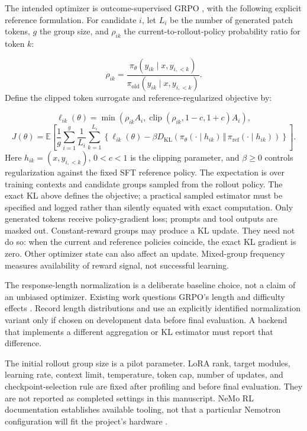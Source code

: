 \documentclass[11pt,a4paper]{article}
\begin{document}
The intended optimizer is outcome-supervised GRPO \cite{ref12}, with the following explicit reference formulation. For candidate $i$, let $L_i$ be the number of generated patch tokens, $g$ the group size, and $\rho_{ik}$ the current-to-rollout-policy probability ratio for token $k$:

\begin{equation}
\rho_{ik}=\frac{\pi_\theta(y_{ik}\mid x,y_{i,<k})}
{\pi_{\mathrm{old}}(y_{ik}\mid x,y_{i,<k})}.
\end{equation}
Define the clipped token surrogate and reference-regularized objective by:

\begin{equation}
\ell_{ik}(\theta)=\min\!\left(\rho_{ik}A_i,\operatorname{clip}(\rho_{ik},1-c,1+c)A_i\right),
\end{equation}
\begin{equation}
J(\theta)=\mathbb{E}\!\left[
\frac{1}{g}\sum_{i=1}^{g}\frac{1}{L_i}\sum_{k=1}^{L_i}
\left\{\ell_{ik}(\theta)-\beta D_{\mathrm{KL}}\!\left(
\pi_\theta(\cdot\mid h_{ik})\,\Vert\,\pi_{\mathrm{ref}}(\cdot\mid h_{ik})
\right)\right\}\right].
\end{equation}
Here $h_{ik}=(x,y_{i,<k})$, $0<c<1$ is the clipping parameter, and $\beta\geq0$ controls regularization against the fixed SFT reference policy. The expectation is over training contexts and candidate groups sampled from the rollout policy. The exact KL above defines the objective; a practical sampled estimator must be specified and logged rather than silently equated with exact computation. Only generated tokens receive policy-gradient loss; prompts and tool outputs are masked out. Constant-reward groups may produce a KL update. They need not do so: when the current and reference policies coincide, the exact KL gradient is zero. Other optimizer state can also affect an update. Mixed-group frequency measures availability of reward signal, not successful learning.

The response-length normalization is a deliberate baseline choice, not a claim of an unbiased optimizer. Existing work questions GRPO's length and difficulty effects \cite{ref16}. Record length distributions and use an explicitly identified normalization variant only if chosen on development data before final evaluation. A backend that implements a different aggregation or KL estimator must report that difference.

The initial rollout group size is a pilot parameter. LoRA rank, target modules, learning rate, context limit, temperature, token cap, number of updates, and checkpoint-selection rule are fixed after profiling and before final evaluation. They are not reported as completed settings in this manuscript. NeMo RL documentation establishes available tooling, not that a particular Nemotron configuration will fit the project's hardware \cite{ref13,ref14}.
\end{document}
